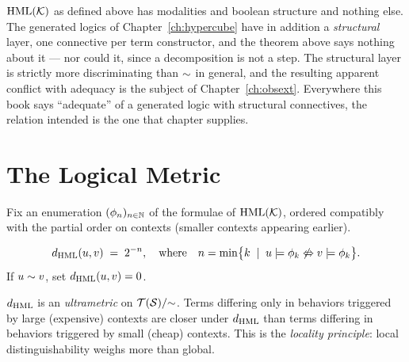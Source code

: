 \begin{remark}
\label{lts:rem:modalonly}
$\mathrm{HML}(\mathcal{K})$ as defined above has modalities and boolean structure and nothing
else. The generated logics of Chapter~\ref{ch:hypercube} have in addition a
\emph{structural} layer, one connective per term constructor, and the theorem
above says nothing about it --- nor could it, since a decomposition is not a step.
The structural layer is strictly more discriminating than $\sim$ in general, and
the resulting apparent conflict with adequacy is the subject of
Chapter~\ref{ch:obsext}. Everywhere this book says ``adequate'' of a generated
logic with structural connectives, the relation intended is the one that chapter
supplies.
\end{remark}

\section{The Logical Metric}

Fix an enumeration $(\phi_n)_{n \in \mathbb{N}}$ of the formulae of $\mathrm{HML}(\mathcal{K})$,
ordered compatibly with the partial order on contexts (smaller contexts
appearing earlier).

\begin{definition}
\[
  d_{\mathrm{HML}}(u, v) \;=\; 2^{-n}, \quad\text{where}\quad
  n = \min\bigl\{k \;\mid\; u \models \phi_k \not\Leftrightarrow v \models \phi_k\bigr\}.
\]
If $u \sim v$, set $d_{\mathrm{HML}}(u, v) = 0$.
\end{definition}

\begin{proposition}
$d_{\mathrm{HML}}$ is an \emph{ultrametric} on $\mathcal{T}(\mathcal{S})/{\sim}$.
Terms differing only in behaviors triggered by large (expensive) contexts
are closer under $d_{\mathrm{HML}}$ than terms differing in behaviors triggered
by small (cheap) contexts.  This is the \emph{locality principle}: local
distinguishability weighs more than global.
\end{proposition}

